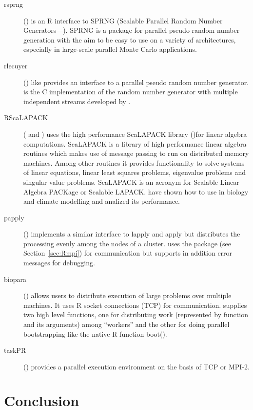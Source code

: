 \begin{description}
\item[rsprng] (\cite{li07rsprng}) is an R interface to SPRNG (Scalable
  Parallel Random 
  Number Generators---\cite{mascagni00ssl}). SPRNG is a package for parallel
  pseudo random number generation with the aim to be easy to use on a
  variety of architectures, especially in large-scale parallel Monte
  Carlo applications.
\item[rlecuyer] (\cite{sevcikova05rlecuyer}) like 
  provides an interface to a parallel pseudo random number
  generator.  is the C implementation of the  
  random number generator with multiple independent streams developed
  by \cite{l'ecuyer02RNG}.
\item[RScaLAPACK] (\cite{samatova05RSca} and \cite{yoginath05rhp})
  uses the high performance ScaLAPACK library
  (\cite{dongarra97sus})for linear algebra computations. ScaLAPACK is
  a library of high performance linear algebra routines which makes
  use of message passing to run on distributed memory machines. Among
  other routines it provides functionality to solve systems of linear equations, linear
  least squares problems, eigenvalue problems and singular value
  problems. ScaLAPACK is an acronym for Scalable Linear Algebra
  PACKage or Scalable LAPACK. \cite{samatova06hps} have shown how to
  use  in biology and climate modelling and analized
  its performance.
\item[papply] (\cite{currie05papply}) implements a similar interface
  to lapply and apply but distributes the processing evenly among the
  nodes of a cluster.  uses the package  (see
  Section~\ref{sec:Rmpi}) for
  communication but supports in addition error messages for debugging.
\item[biopara] (\cite{lazar06biopara}) allows users to distribute
  execution of large problems over multiple machines. It uses R socket
  connections (TCP) for communication.  supplies two high
  level functions, one for distributing work (represented by function
  and its arguments) among ``workers'' and the other for doing
  parallel bootstrapping like the native R function boot(). 
\item[taskPR] (\cite{samatova04taskPR}) provides a parallel execution
  environment on the basis of TCP or MPI-2.
\end{description}

\section{Conclusion}

